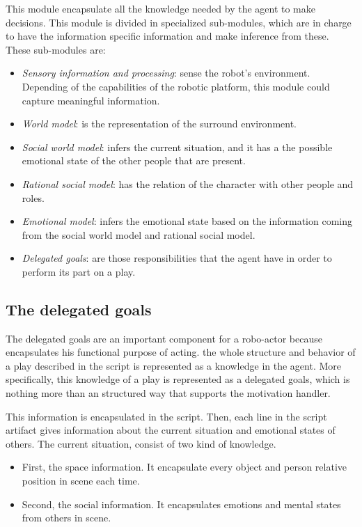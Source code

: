 This module encapsulate all the knowledge needed by the agent to make decisions. This module is divided in specialized sub-modules, which are in charge to have the information specific information and make inference from these. These sub-modules are:
\begin{itemize}
	\item \textit{Sensory information and processing}: sense the robot's environment. Depending of the capabilities of the robotic platform, this module could capture meaningful information.
	\item \textit{World model}: is the representation of the surround environment.
	\item \textit{Social world model}: infers the current situation, and it has a the possible emotional state of the other people that are present.
	\item \textit{Rational social model}: has the relation of the character with other people and roles.
	\item \textit{Emotional model}: infers the emotional state based on the information coming from the social world model and rational social model.
	\item \textit{Delegated goals}: are those responsibilities that the agent have in order to perform its part on a play.
\end{itemize}
\subsection{The delegated goals}
The delegated goals are an important component for a robo-actor because encapsulates his functional purpose of acting. the whole structure and behavior of a play described in the script is represented as a knowledge in the agent. More specifically, this knowledge of a play is represented as a delegated goals, which is nothing more than an structured way that supports the motivation handler. 

This information is encapsulated in the script. Then, each line in the script artifact gives information about the current situation and emotional states of others. The current situation, consist of two kind of knowledge. 

\begin{itemize}
\item First, the space information. It encapsulate every object and person relative position in scene each time. 

\item Second, the social information. It encapsulates emotions and mental states from others in scene.
\end{itemize}

